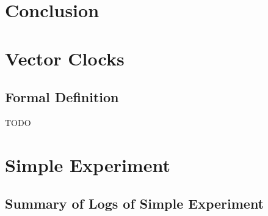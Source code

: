 \documentclass[12pt,a4paper,twoside,openright]{report}
\begin{document}
\chapter{Conclusion}



\printbibliography

\appendix

\chapter{Vector Clocks}

\section{Formal Definition}
\label{appendix:vectorclocks}
TODO


\chapter{Simple Experiment}

\section{Summary of Logs of Simple Experiment}
\label{appendix:simplelogsummary}
\end{document}
